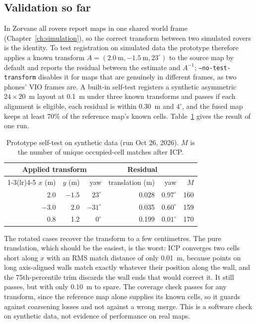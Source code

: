 \subsection{Validation so far}

In Zorvane all rovers report maps in one shared world frame (Chapter~\ref{ch:simulation}), so the correct transform between two simulated rovers is the identity.
To test registration on simulated data the prototype therefore applies a known transform $A = (2.0~\text{m}, -1.5~\text{m}, 23^\circ)$ to the source map by default and reports the residual between the estimate and $A^{-1}$; \texttt{--no-test-transform} disables it for maps that are genuinely in different frames, as two phones' VIO frames are.
A built-in self-test registers a synthetic asymmetric $24 \times 20$~m layout at 0.1~m under three known transforms and passes if each alignment is eligible, each residual is within 0.30~m and $4^\circ$, and the fused map keeps at least 70\% of the reference map's known cells.
Table~\ref{tab:fusion-selftest} gives the result of one run.

\begin{table}[ht]
\centering
\begin{tabular}{rrrrrr}
\toprule
\multicolumn{3}{c}{Applied transform} & \multicolumn{2}{c}{Residual} & \\
\cmidrule(lr){1-3}\cmidrule(lr){4-5}
$x$ (m) & $y$ (m) & yaw & translation (m) & yaw & $M$ \\
\midrule
2.0 & $-1.5$ & $23^\circ$ & 0.028 & $0.97^\circ$ & 160 \\
$-3.0$ & 2.0 & $-31^\circ$ & 0.035 & $0.60^\circ$ & 159 \\
0.8 & 1.2 & $0^\circ$ & 0.199 & $0.01^\circ$ & 170 \\
\bottomrule
\end{tabular}
\caption{Prototype self-test on synthetic data (run Oct 26, 2026). $M$ is the number of unique occupied-cell matches after ICP.}
\label{tab:fusion-selftest}
\end{table}

The rotated cases recover the transform to a few centimetres.
The pure translation, which should be the easiest, is the worst: ICP converges two cells short along $x$ with an RMS match distance of only 0.01~m, because points on long axis-aligned walls match exactly whatever their position along the wall, and the 75th-percentile trim discards the wall ends that would correct it.
It still passes, but with only 0.10~m to spare.
The coverage check passes for any transform, since the reference map alone supplies its known cells, so it guards against coarsening losses and not against a wrong merge.
This is a software check on synthetic data, not evidence of performance on real maps.

